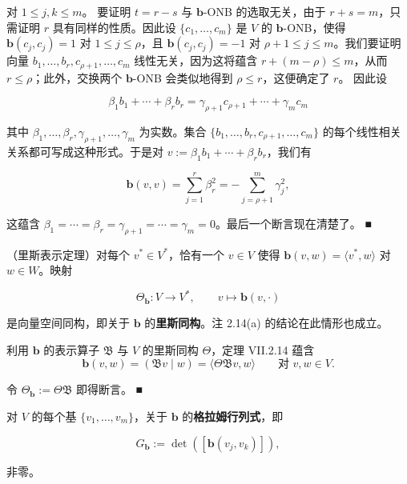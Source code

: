 \begin{remark}
\begin{items}
对 $ 1 \le j, k \le m $。
要证明 $ t = r - s $ 与 $ \mathbf{b} $-ONB 的选取无关，由于 $ r + s = m $，只需证明 $ r $ 具有同样的性质。因此设 $ \{c_1, \ldots, c_m\} $ 是 $ V $ 的 $ \mathbf{b} $-ONB，使得 $ \mathbf{b}(c_j, c_j) = 1 $ 对 $ 1 \le j \le \rho $，且 $ \mathbf{b}(c_j, c_j) = -1 $ 对 $ \rho + 1 \le j \le m $。我们要证明向量 $ b_1, \ldots, b_r, c_{\rho+1}, \ldots, c_m $ 线性无关，因为这将蕴含 $ r + (m - \rho) \le m $，从而 $ r \le \rho $；此外，交换两个 $ \mathbf{b} $-ONB 会类似地得到 $ \rho \le r $，这便确定了 $ r $。
因此设

\[
\beta_1 b_1 + \cdots + \beta_r b_r = \gamma_{\rho+1} c_{\rho+1} + \cdots + \gamma_m c_m
\]

其中 $ \beta_1, \ldots, \beta_r, \gamma_{\rho+1}, \ldots, \gamma_m $ 为实数。集合 $ \{b_1, \ldots, b_r, c_{\rho+1}, \ldots, c_m\} $ 的每个线性相关关系都可写成这种形式。于是对 $ v := \beta_1 b_1 + \cdots + \beta_r b_r $，我们有

\[
\mathbf{b}(v,v) = \sum_{j=1}^{r} \beta_r^2 = - \sum_{j=\rho+1}^{m} \gamma_j^2 ,
\]

这蕴含 $ \beta_1 = \cdots = \beta_r = \gamma_{\rho+1} = \cdots = \gamma_m = 0 $。最后一个断言现在清楚了。 \nobreak\hspace{0.35em}■

\item

（里斯表示定理）对每个 $ v^* \in V^* $，恰有一个 $ v \in V $ 使得 $ \mathbf{b}(v,w) = \langle v^*, w \rangle $ 对 $ w \in W $。映射

\[
\Theta_{\mathbf{b}}: V \to V^*, \qquad v \mapsto \mathbf{b}(v, \cdot)
\]

是向量空间同构，即关于 $ \mathbf{b} $ 的\textbf{里斯同构}。注 2.14(a) 的结论在此情形也成立。

\proofhead
利用 $ \mathbf{b} $ 的表示算子 $ \mathfrak{B} $ 与 $ V $ 的里斯同构 $ \Theta $，定理 VII.2.14 蕴含
\[
\mathbf{b}(v,w) = (\mathfrak{B}v \mid w) = \langle \Theta\mathfrak{B}v, w \rangle \qquad \text{对 } v, w \in V.
\]

令 $ \Theta_{\mathbf{b}} := \Theta\mathfrak{B} $ 即得断言。 \nobreak\hspace{0.35em}■

\item

对 $ V $ 的每个基 $ \{v_1, \ldots, v_m\} $，关于 $ \mathbf{b} $ 的\textbf{格拉姆行列式}，即

\[
G_{\mathbf{b}} := \det([\mathbf{b}(v_j, v_k)]) ,
\]

非零。


\end{items}
\end{remark}
